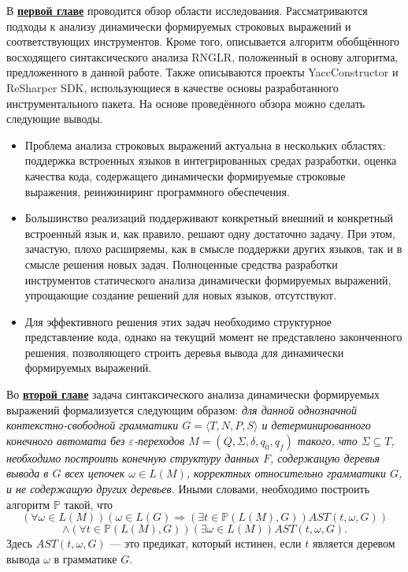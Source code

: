 В \underline{\textbf{первой главе}} проводится обзор области исследования. Рассматриваются подходы к анализу динамически формируемых строковых 
выражений и соответствующих инструментов. Кроме того, описывается алгоритм обобщённого восходящего синтаксического анализа RNGLR, положенный в основу алгоритма, предложенного в данной работе. Также описываются 
проекты YaccConstructor и ReSharper SDK, использующиеся в качестве основы разработанного инструментального пакета. На основе проведённого обзора можно сделать следующие выводы.

\begin{itemize}
    \item Проблема анализа строковых выражений актуальна в нескольких областях: поддержка встроенных языков в интегрированных средах разработки, оценка качества кода, содержащего динамически формируемые строковые выражения, реинжиниринг программного обеспечения.
    \item Большинство реализаций поддерживают конкретный внешний и конкретный встроенный язык и, как правило, решают одну достаточно задачу. При этом, зачастую, плохо расширяемы, как в смысле поддержки других языков, так и в смысле решения новых задач. Полноценные средства разработки инструментов статического анализа динамически формируемых выражений, упрощающие создание решений для новых языков, отсутствуют.
    \item Для эффективного решения этих задач необходимо структурное представление кода, однако на текущий момент не представлено законченного решения, позволяющего строить деревья вывода для динамически формируемых выражений.
\end{itemize}

Во \underline{\textbf{второй главе}} задача синтаксического анализа динамически формируемых выражений формализуется следующим образом: \textit{ для данной однозначной контекстно-свободной грамматики $G = \langle T, N, P, S \rangle$ и детерминированного конечного автомата без $\varepsilon$-переходов $M=(Q,\Sigma,\delta,q_0,q_f)$ такого, что $\Sigma \subseteq T$, необходимо построить конечную структуру данных $F$, содержащую деревья вывода в $G$ всех цепочек $\omega \in L(M)$, корректных относительно грамматики $G$, и не содержащую других деревьев. } Иными словами, необходимо построить алгоритм $\mathbb{P}$ такой, что
    $$(\forall \omega \in L(M)) (\omega \in L(G) \Rightarrow (\exists t \in \mathbb{P}(L(M),G))AST(t, \omega, G))$$
    $$\land (\forall t \in \mathbb{P}(L(M),G))(\exists \omega \in L(M))AST(t,\omega,G).$$ 
    Здесь $AST(t,\omega,G)$ --- это предикат, который истинен, если $t$ является деревом вывода $\omega$ в грамматике $G$.


